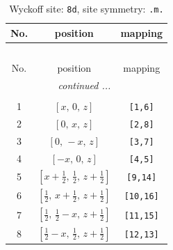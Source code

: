 \documentclass[fleqn,8pt]{jsarticle}
\begin{document}
\begin{longtable}{ccc}
\caption{Wyckoff site: {\tt 8d}, site symmetry: {\tt .m.}}
 \\
 \hline \hline
No. & position & mapping \\ \hline \endfirsthead

\multicolumn{2}{l}{\tablename\ \thetable{}} \\
 \hline \hline
No. & position & mapping \\ \hline \endhead

 \hline \hline
\multicolumn{2}{r}{\footnotesize\it continued ...} \\ \endfoot

 \hline \hline
\multicolumn{2}{r}{} \\ \endlastfoot

1 & $\left[ x,\, 0,\, z \right]$ & {\tt [1,6]} \\ \hline
2 & $\left[ 0,\, x,\, z \right]$ & {\tt [2,8]} \\ \hline
3 & $\left[ 0,\, - x,\, z \right]$ & {\tt [3,7]} \\ \hline
4 & $\left[ - x,\, 0,\, z \right]$ & {\tt [4,5]} \\ \hline
5 & $\left[ x + \frac{1}{2},\, \frac{1}{2},\, z + \frac{1}{2} \right]$ & {\tt [9,14]} \\ \hline
6 & $\left[ \frac{1}{2},\, x + \frac{1}{2},\, z + \frac{1}{2} \right]$ & {\tt [10,16]} \\ \hline
7 & $\left[ \frac{1}{2},\, \frac{1}{2} - x,\, z + \frac{1}{2} \right]$ & {\tt [11,15]} \\ \hline
8 & $\left[ \frac{1}{2} - x,\, \frac{1}{2},\, z + \frac{1}{2} \right]$ & {\tt [12,13]} \\
\end{longtable}
\renewcommand{\arraystretch}{1.2}
\end{document}
